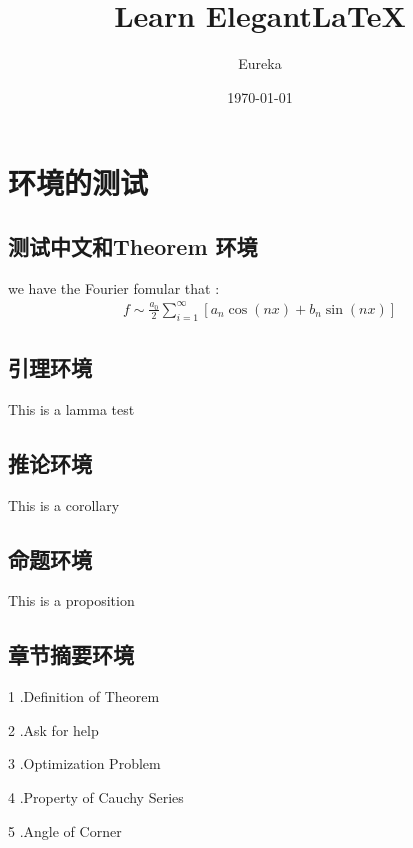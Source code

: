 \documentclass[cn, math=cm]{elegantbook}
\title{Learn Elegant\LaTeX}
\date{\today}
\author{Eureka}
\begin{document}
	\maketitle
	\tableofcontents
	\newpage
	\clearpage

	\section{环境的测试}
	\subsection{测试中文和Theorem 环境}
     \begin{theorem}\label{label-1}
		we have the Fourier fomular that :
		\begin{align}
		f\sim\frac{a_0}{2}\sum_{i=1}^{\infty}{[a_n\cos(nx)+b_n\sin(nx)]}
		\end{align}
		\end{theorem}
		\subsection{引理环境}
		\begin{lemma}
			This is a lamma test
		\end{lemma}
		\subsection{推论环境}
		\begin{corollary}
			This is a corollary
		\end{corollary}
		\subsection{命题环境}
		\begin{proposition}
			This is a proposition
		\end{proposition}
		\subsection{章节摘要环境}
		\begin{introduction}
		\item 1 .Definition of Theorem
		\item 2 .Ask for help\\
		\item 3 .Optimization Problem
		\item 4 .Property of Cauchy Series
		\item 5 .Angle of Corner
	\end{introduction}
\end{document}
